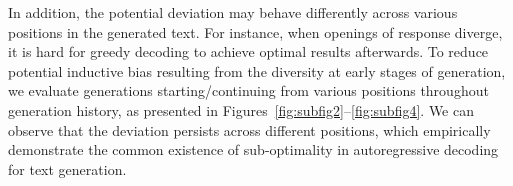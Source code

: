 In addition, the potential deviation may behave differently across various positions in the generated text.
For instance, when openings of response diverge, it is hard for greedy decoding to achieve optimal results afterwards.
To reduce potential inductive bias resulting from the diversity at early stages of generation, we evaluate generations starting/continuing from various positions throughout generation history, as presented in Figures~\ref{fig:subfig2}--\ref{fig:subfig4}.
We can observe that the deviation persists across different positions, which empirically demonstrate the common existence of sub-optimality in autoregressive decoding for text generation.




